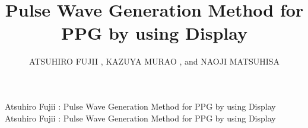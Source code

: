 \documentclass{ieeeaccess}
\begin{document}

\title{Pulse Wave Generation Method for PPG by using Display}
\author{\uppercase{Atsuhiro Fujii}
,
\uppercase{Kazuya Murao}
, and
\uppercase{Naoji Matsuhisa}
}
\address[1]{Ritsumeikan University, Shiga, Japan (e-mail: atsuhiro.fujii@iis.ise.ritsumei.ac.jp)}
\address[2]{Ritsumeikan University, Shiga, Japan (e-mail: murao@cs.ritsumei.ac.jp)}
\address[3]{The University of Tokyo, Tokyo, Japan (e-mail: naoji@iis.u-tokyo.ac.jp)}


\markboth
{Atsuhiro Fujii \headeretal: Pulse Wave Generation Method for PPG by using Display}
{Atsuhiro Fujii \headeretal: Pulse Wave Generation Method for PPG by using Display}

\end{document}
